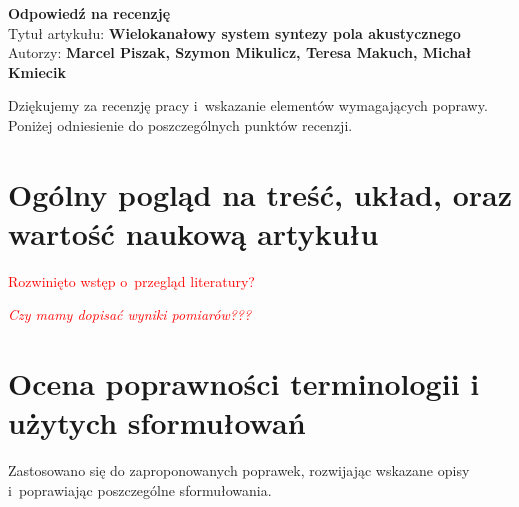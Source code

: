 \documentclass[12pt]{article}
\begin{document}
    \begin{center}
        \textbf{\large Odpowiedź na recenzję }\\
        \vspace{10pt}
        Tytuł artykułu: \textbf{Wielokanałowy system syntezy pola akustycznego}
        \\
        Autorzy: \textbf{Marcel Piszak, Szymon Mikulicz, Teresa Makuch, Michał
        Kmiecik}
    \end{center}

Dziękujemy za recenzję pracy i~wskazanie elementów wymagających poprawy.
Poniżej odniesienie do poszczególnych punktów recenzji.

\section{Ogólny pogląd na treść, układ, oraz wartość
naukową artykułu}

\textcolor{red}{Rozwinięto wstęp o~przegląd literatury?}

\textcolor{red}{\textit{Czy mamy dopisać wyniki pomiarów???}}

\section{Ocena poprawności terminologii i użytych sformułowań}

Zastosowano się do zaproponowanych poprawek, rozwijając wskazane opisy
i~poprawiając poszczególne sformułowania.
\end{document}

